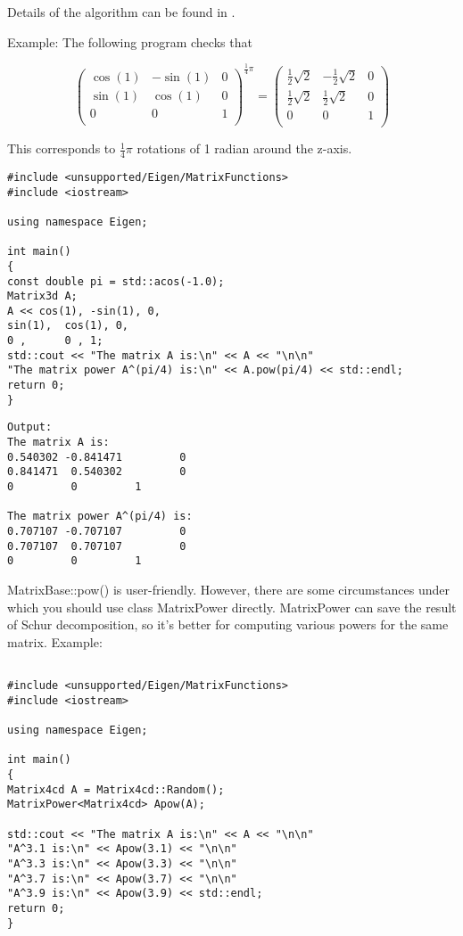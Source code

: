 Details of the algorithm can be found in \cite{Higham_2011}.

Example: The following program checks that 

\begin{equation} 
\begin{pmatrix}
\cos(1) & -\sin(1) & 0 \\
\sin(1)  & \cos(1) & 0 \\
0 & 0 & 1 \\
\end{pmatrix}
^{\tfrac{1}{4}\pi} =
\begin{pmatrix}
\tfrac{1}{2}\sqrt{2} & -\tfrac{1}{2}\sqrt{2} & 0 \\
\tfrac{1}{2}\sqrt{2} & \tfrac{1}{2}\sqrt{2} & 0 \\
0 & 0 & 1 \\
\end{pmatrix}
\end{equation} 



This corresponds to $\tfrac{1}{4}\pi$ rotations of 1 radian around the z-axis.


\begin{lstlisting}
#include <unsupported/Eigen/MatrixFunctions>
#include <iostream>

using namespace Eigen;

int main()
{
const double pi = std::acos(-1.0);
Matrix3d A; 
A << cos(1), -sin(1), 0,
sin(1),  cos(1), 0,
0 ,      0 , 1;
std::cout << "The matrix A is:\n" << A << "\n\n"
"The matrix power A^(pi/4) is:\n" << A.pow(pi/4) << std::endl;	
return 0;
}
\end{lstlisting}

\begin{verbatim}		
Output:
The matrix A is:
0.540302 -0.841471         0
0.841471  0.540302         0
0         0         1

The matrix power A^(pi/4) is:
0.707107 -0.707107         0
0.707107  0.707107         0
0         0         1
\end{verbatim}

MatrixBase::pow() is user-friendly. However, there are some circumstances under which you should use class MatrixPower directly. MatrixPower can save the result of Schur decomposition, so it's better for computing various powers for the same matrix.
Example: 


\begin{lstlisting}

#include <unsupported/Eigen/MatrixFunctions>
#include <iostream>

using namespace Eigen;

int main()
{
Matrix4cd A = Matrix4cd::Random();
MatrixPower<Matrix4cd> Apow(A); 

std::cout << "The matrix A is:\n" << A << "\n\n"               
"A^3.1 is:\n" << Apow(3.1) << "\n\n"               
"A^3.3 is:\n" << Apow(3.3) << "\n\n"               
"A^3.7 is:\n" << Apow(3.7) << "\n\n"               
"A^3.9 is:\n" << Apow(3.9) << std::endl;
return 0;
}
\end{lstlisting}

